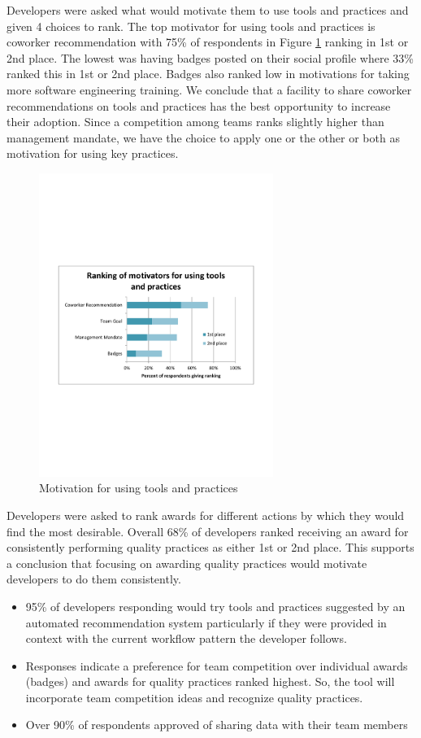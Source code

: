 \documentclass{sig-alternate}
\begin{document}
Developers were asked what would motivate them to use tools and practices and given 4 choices to rank.  The top motivator for using tools and practices is coworker recommendation with 75\% of respondents in Figure \ref{fig:toolandpracticemotivators}   ranking in 1st or 2nd place. The lowest was having badges posted on their social profile where 33\% ranked this in 1st or 2nd place.   Badges also ranked low in motivations for taking more software engineering training.  We conclude that a facility to share coworker recommendations on tools and practices has the best opportunity to increase their adoption.  Since a competition among teams ranks slightly higher than management mandate, we have the choice to apply one or the other or both as motivation for using key practices.  
 
\begin{figure}\begin{mdframed}[linecolor=white]
	\includegraphics[width=3in]{ToolAndPracticeMotivators.pdf}
	\caption{Motivation for using tools and practices}
	\label{fig:toolandpracticemotivators}
\end{mdframed}\end{figure}

Developers were asked to rank awards for different actions by which they would find the most desirable.  Overall 68\% of developers ranked receiving an award for consistently performing quality practices as either 1st or 2nd place.  This supports a conclusion that focusing on awarding quality practices would motivate developers to do them consistently.
\begin{itemize}
\item 95\% of developers responding would try tools and practices suggested by an automated recommendation system particularly if they were provided in context with the current workflow pattern the developer follows.
\item Responses indicate a preference for team competition over individual awards (badges) and awards for quality practices ranked highest.  So, the tool will incorporate team competition ideas and recognize quality practices.
\item Over 90\% of respondents approved of sharing data with their team members
\end{itemize}
\end{document}
